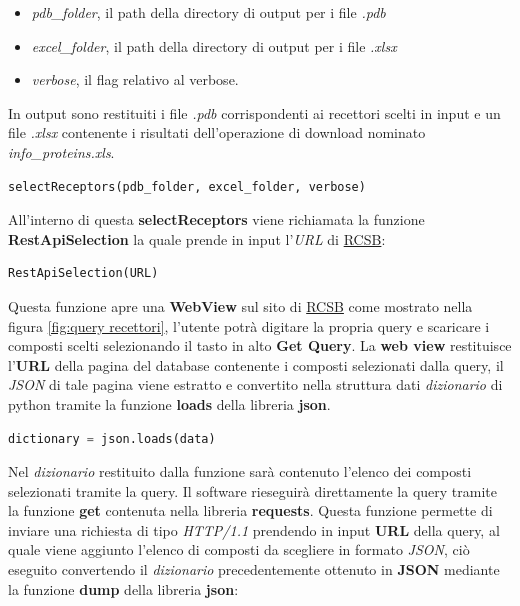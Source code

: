 \begin{itemize}
    \item \textit{pdb\_folder}, il path della directory di output per i file \textit{.pdb}
    \item \textit{excel\_folder}, il path della directory di output per i file \textit{.xlsx}
    \item \textit{verbose}, il flag relativo al verbose.
\end{itemize}

In output sono restituiti i file \textit{.pdb} corrispondenti ai recettori scelti in input e un file \textit{.xlsx} contenente i risultati dell'operazione di download nominato \textit{info\_proteins.xls}.

\begin{lstlisting}[language=Python, label=lst:code12, caption={funzione selectReceptors}]
selectReceptors(pdb_folder, excel_folder, verbose)
\end{lstlisting}

All'interno di questa \textbf{selectReceptors} viene richiamata la funzione \textbf{RestApiSelection} la quale prende in input l'\textit{URL} di \href{https://www.rcsb.org/search}{RCSB}:

\begin{lstlisting}[language=Python, label=lst:code13, caption={funzione RestApiSelection}]
RestApiSelection(URL)
\end{lstlisting}

Questa funzione apre una \textbf{WebView} sul sito di \href{https://www.rcsb.org/search}{RCSB} come mostrato nella figura \ref{fig:query recettori}, l'utente potrà digitare la propria query e scaricare i composti scelti selezionando il tasto in alto \textbf{Get Query}.\newline
La \textbf{web view} restituisce l'\textbf{URL} della pagina del database contenente i composti selezionati dalla query, il \textit{JSON} di tale pagina viene estratto e convertito nella struttura dati \textit{dizionario} di python tramite la funzione \textbf{loads} della libreria \textbf{json}.

\begin{lstlisting}[language=Python, label=lst:code14, caption={funzione json.loads}]
dictionary = json.loads(data)
\end{lstlisting}

Nel \textit{dizionario} restituito dalla funzione sarà contenuto l'elenco dei composti selezionati tramite la query.\newline
Il software rieseguirà direttamente la query tramite la funzione \textbf{get} contenuta nella libreria \textbf{requests}. Questa funzione permette di inviare una richiesta di tipo \textit{HTTP/1.1} prendendo in input \textbf{URL} della query, al quale viene aggiunto l'elenco di composti da scegliere in formato \textit{JSON}, ciò eseguito convertendo il \textit{dizionario} precedentemente ottenuto in \textbf{JSON}
mediante la funzione \textbf{dump} della libreria \textbf{json}:

